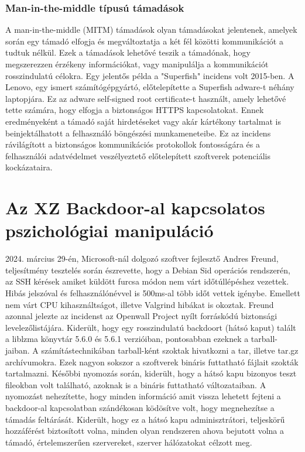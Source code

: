 \documentclass[11pt]{article}
\begin{document}
\subsubsection{Man-in-the-middle típusú támadások}

A man-in-the-middle (MITM) támadások olyan támadásokat jelentenek, amelyek során egy támadó elfogja és megváltoztatja a két fél közötti kommunikációt a tudtuk nélkül. Ezek a támadások lehetővé teszik a támadónak, hogy megszerezzen érzékeny információkat, vagy manipulálja a kommunikációt rosszindulatú célokra. 
Egy jelentős példa a "Superfish" incidens volt 2015-ben. A Lenovo, egy ismert számítógépgyártó, előtelepítette a Superfish adware-t néhány laptopjára. Ez az adware self-signed root certificate-t használt, amely lehetővé tette számára, hogy elfogja a biztonságos HTTPS kapcsolatokat. Ennek eredményeként a támadó saját hirdetéseket vagy akár kártékony tartalmat is beinjektálhatott a felhasználó böngészési munkameneteibe. Ez az incidens rávilágított a biztonságos kommunikációs protokollok fontosságára és a felhasználói adatvédelmet veszélyeztető előtelepített szoftverek potenciális kockázataira.

\cite{Goodin2015Lenovo}

\section{Az XZ Backdoor-al kapcsolatos pszichológiai manipuláció}

2024. március 29-én, Microsoft-nál dolgozó szoftver fejlesztő Andres Freund, teljesítmény tesztelés során észrevette, hogy a Debian Sid operációs rendszerén, az SSH kérések amiket küldött furcsa módon nem várt időtúllépéshez vezettek. Hibás jelszóval és felhasználónévvel is 500ms-al több időt vettek igénybe. Emellett nem várt CPU kihasználtságot, illetve Valgrind hibákat is okoztak.
Freund azonnal jelezte az incidenst az Openwall Project nyílt forráskódú biztonsági levelezőlistájára.
Kiderült, hogy egy rosszindulatú backdoort (hátsó kaput) talált a liblzma könyvtár 5.6.0 és 5.6.1 verzióiban, pontosabban ezeknek a tarball-jaiban. \cite{Freund_2024}
A számítástechnikában tarball-ként szoktak hivatkozni a tar, illetve tar.gz archívumokra. Ezek nagyon sokszor a szoftverek bináris futtatható fájlait szokták tartalmazni. 
Későbbi nyomozás során, kiderült, hogy a hátsó kapu bizonyos teszt fileokban volt található, azoknak is a bináris futtatható változataiban. A nyomozást nehezítette, hogy minden információ amit vissza lehetett fejteni a backdoor-al kapcsolatban szándékosan ködösítve volt, hogy megnehezítse a támadás feltárását.
Kiderült, hogy ez a hátsó kapu adminisztrátori, teljeskörű hozzáférést biztosított volna, minden olyan rendszeren ahova bejutott volna a támadó, értelemszerűen szervereket, szerver hálózatokat célzott meg.
\end{document}
